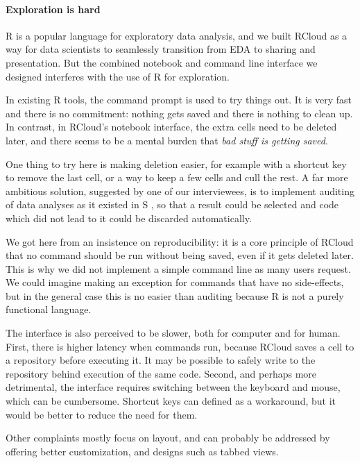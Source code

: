 \paragraph*{Exploration is hard}
R is a popular language for exploratory data analysis, and we built RCloud
as a way for data scientists to seamlessly transition from EDA to sharing
and presentation. But the combined notebook and command line interface we
designed interferes with the use of R for exploration.

In existing R tools, the command prompt is used to try things out. It is very
fast and there is no commitment: nothing gets saved and there is nothing to
clean up. In contrast, in RCloud's notebook interface, the extra cells need
to be deleted later, and there seems to be a mental burden that \emph{bad stuff
is getting saved}.

One thing to try here is making deletion easier, for example with a
shortcut key to remove the last cell, or a way to keep a few cells and cull
the rest. A far more ambitious solution, suggested by one of our
interviewees, is to implement auditing of data analyses as it existed in S
\cite{Becker:1988:Auditing}, so that a result could be selected and code
which did not lead to it could be discarded automatically.

We got here from an insistence on reproducibility: it is a core principle
of RCloud that no command should be run without being saved, even if it
gets deleted later. This is why we did not implement a simple command line
as many users request. We could imagine making an exception for commands
that have no side-effects, but in the general case this is no easier than
auditing because R is not a purely functional language.

The interface is also perceived to be slower, both for computer and for
human. First, there is higher latency when commands run, because
RCloud saves a cell to a repository before executing it. It
may be possible to safely write to the repository behind execution of the
same code. Second, and perhaps more detrimental, the interface requires
switching between the keyboard and mouse, which can be cumbersome.
Shortcut keys can defined as a workaround, but it would be better
to reduce the need for them.

Other complaints mostly focus on layout, and can probably be addressed by
offering better customization, and designs such as tabbed views.


